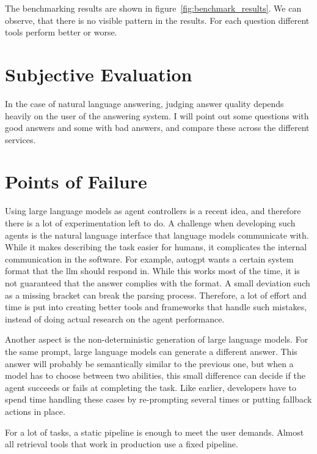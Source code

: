 \documentclass[../main.tex]{subfiles}
\begin{document}
The benchmarking results are shown in figure~\ref{fig:benchmark_results}.
We can observe, that there is no visible pattern in the results.
For each question different tools perform better or worse.

\section{Subjective Evaluation}
\label{sec:subjective_evaluation}

In the case of natural language answering, judging answer quality depends heavily
on the user of the answering system.
I will point out some questions with good answers and some with bad answers,
and compare these across the different services.

\section{Points of Failure}
\label{sec:pof}

Using large language models as agent controllers is a recent idea, and therefore there is a lot of experimentation left to do.
A challenge when developing such agents is the natural language interface that language models communicate with.
While it makes describing the task easier for humans, it complicates the internal communication in the software.
For example, \gls{autogpt} wants a certain system format that the \gls{llm} should respond in.
While this works most of the time, it is not guaranteed that the answer complies with the format.
A small deviation such as a missing bracket can break the parsing process.
Therefore, a lot of effort and time is put into creating better tools and frameworks that handle such mistakes,
instead of doing actual research on the agent performance.

Another aspect is the non-deterministic generation of large language models. %
For the same prompt, large language models can generate a different answer.
This answer will probably be semantically similar to the previous one,
but when a model has to choose between two abilities,
this small difference can decide if the agent succeeds or fails at completing the task.
Like earlier, developers have to spend time handling these cases by re-prompting several times or putting fallback actions in place.

For a lot of tasks, a static pipeline is enough to meet the user demands.
Almost all retrieval tools that work in production use a fixed pipeline.
\end{document}

